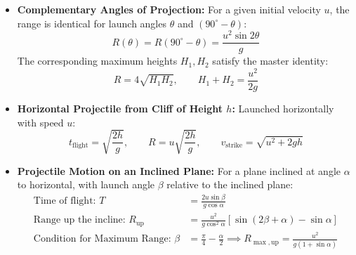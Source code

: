 \documentclass[10pt,twoside,openright]{book}
\begin{document}
\begin{usecasebox}
\begin{itemize}
  \item \textbf{Complementary Angles of Projection:} For a given initial velocity $u$, the range is identical for launch angles $\theta$ and $(90^\circ - \theta)$:
  \begin{equation}
    R(\theta) = R(90^\circ - \theta) = \frac{u^2\sin 2\theta}{g}
  \end{equation}
  The corresponding maximum heights $H_1, H_2$ satisfy the master identity:
  \begin{equation}
    R = 4\sqrt{H_1 H_2}, \qquad H_1 + H_2 = \frac{u^2}{2g}
  \end{equation}
  \item \textbf{Horizontal Projectile from Cliff of Height $h$:} Launched horizontally with speed $u$:
  \begin{equation}
    t_{\text{flight}} = \sqrt{\frac{2h}{g}}, \qquad R = u\sqrt{\frac{2h}{g}}, \qquad v_{\text{strike}} = \sqrt{u^2 + 2gh}
  \end{equation}
  \item \textbf{Projectile Motion on an Inclined Plane:} For a plane inclined at angle $\alpha$ to horizontal, with launch angle $\beta$ relative to the inclined plane:
  \begin{align}
    \text{Time of flight: } T &= \frac{2u\sin\beta}{g\cos\alpha} \\
    \text{Range up the incline: } R_{\text{up}} &= \frac{u^2}{g\cos^2\alpha}\left[\sin(2\beta + \alpha) - \sin\alpha\right] \\
    \text{Condition for Maximum Range: } \beta &= \frac{\pi}{4} - \frac{\alpha}{2} \implies R_{\max,\text{up}} = \frac{u^2}{g(1 + \sin\alpha)}
  \end{align}
\end{itemize}
\end{usecasebox}
\end{document}
